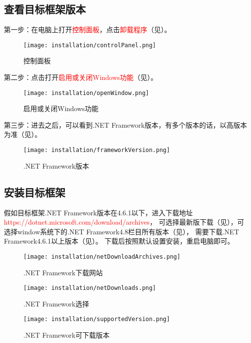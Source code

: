 \subsection{查看目标框架版本}
第一步：在电脑上打开\textcolor{red}{控制面板}，点击\textcolor{red}{卸载程序}（见）。
\begin{figure}[htbp]
    \centering
    \texttt{[image: installation/controlPanel.png]}
    \caption{ 控制面板 \label{fig:controlPanel}}
\end{figure}
第二步：点击打开\textcolor{red}{启用或关闭Windows功能}（见）。
\begin{figure}[htbp]
    \centering
    \texttt{[image: installation/openWindow.png]}
    \caption{ 启用或关闭Windows功能 \label{fig:openWindow}}
\end{figure}
第三步：进去之后，可以看到.NET Framework版本，有多个版本的话，以高版本为准（见）。
\begin{figure}[htbp]
    \centering
    \texttt{[image: installation/frameworkVersion.png]}
    \caption{ .NET Framework版本 \label{fig:frameworkVersion}}
\end{figure}

\subsection{安装目标框架}
假如目标框架.NET Framework版本在4.6.1以下，进入下载地址\textcolor{red}{https://dotnet.microsoft.com/download/archives}，
可选择最新版下载（见），可选择window系统下的.NET Framework4.8栏目所有版本（见），
需要下载.NET Framework4.6.1以上版本（见）。
下载后按照默认设置安装，重启电脑即可。
\begin{figure}[htbp]
    \centering
    \texttt{[image: installation/netDownloadArchives.png]}
    \caption{ .NET Framework下载网站 \label{fig:netDownloadArchives}}
\end{figure}
\begin{figure}[htbp]
    \centering
    \texttt{[image: installation/netDownloads.png]}
    \caption{ .NET Framework选择 \label{fig:netDownloads}}
\end{figure}
\begin{figure}[htbp]
    \centering
    \texttt{[image: installation/supportedVersion.png]}
    \caption{ .NET Framework可下载版本 \label{fig:supportedVersion}}
\end{figure}

